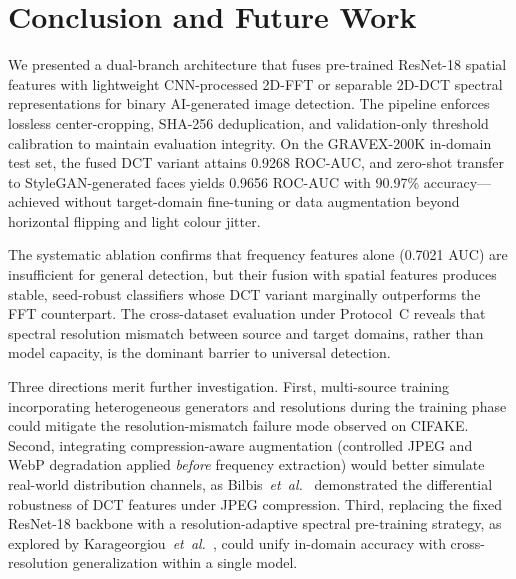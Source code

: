 \documentclass[conference]{IEEEtran}
\begin{document}

\section{Conclusion and Future Work}
\label{sec:conclusion}

We presented a dual-branch architecture that fuses pre-trained ResNet-18 spatial features with lightweight CNN-processed 2D-FFT or separable 2D-DCT spectral representations for binary AI-generated image detection. The pipeline enforces lossless center-cropping, SHA-256 deduplication, and validation-only threshold calibration to maintain evaluation integrity. On the GRAVEX-200K in-domain test set, the fused DCT variant attains 0.9268 ROC-AUC, and zero-shot transfer to StyleGAN-generated faces yields 0.9656 ROC-AUC with 90.97\% accuracy---achieved without target-domain fine-tuning or data augmentation beyond horizontal flipping and light colour jitter.

The systematic ablation confirms that frequency features alone (0.7021 AUC) are insufficient for general detection, but their fusion with spatial features produces stable, seed-robust classifiers whose DCT variant marginally outperforms the FFT counterpart. The cross-dataset evaluation under Protocol~C reveals that spectral resolution mismatch between source and target domains, rather than model capacity, is the dominant barrier to universal detection.

Three directions merit further investigation. First, multi-source training incorporating heterogeneous generators and resolutions during the training phase could mitigate the resolution-mismatch failure mode observed on CIFAKE. Second, integrating compression-aware augmentation (controlled JPEG and WebP degradation applied \emph{before} frequency extraction) would better simulate real-world distribution channels, as Bilbis~\emph{et~al.}~\cite{bilbis2025dctvsfft} demonstrated the differential robustness of DCT features under JPEG compression. Third, replacing the fixed ResNet-18 backbone with a resolution-adaptive spectral pre-training strategy, as explored by Karageorgiou~\emph{et~al.}~\cite{karageorgiou2025spai}, could unify in-domain accuracy with cross-resolution generalization within a single model.





\end{document}
